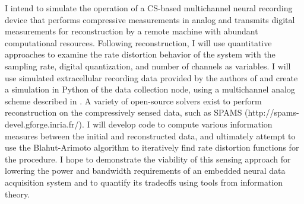 \documentclass{paper}
\begin{document}
I intend to simulate the operation of a CS-based multichannel neural recording device that performs compressive measurements in analog and transmits digital measurements for reconstruction by a remote machine with abundant computational resources.  Following reconstruction, I will use quantitative approaches to examine the rate distortion behavior of the system with the sampling rate, digital quantization, and number of channels as variables. I will use simulated extracellular recording data provided by the authors of \cite{quiroga2004} and create a simulation in Python of  the data collection node, using a multichannel analog scheme described in \cite{slavinsky2011}. A variety of open-source solvers exist to perform reconstruction on the compressively sensed data, such as SPAMS (http://spams-devel.gforge.inria.fr/). I will develop code to compute various information measures between the initial and reconstructed data, and ultimately attempt to use the Blahut-Arimoto algorithm to iteratively find rate distortion functions for the procedure. I hope to demonstrate the viability of this sensing approach for lowering the power and bandwidth requirements of an embedded neural data acquisition system and to quantify its tradeoffs using tools from information theory.



\end{document}
